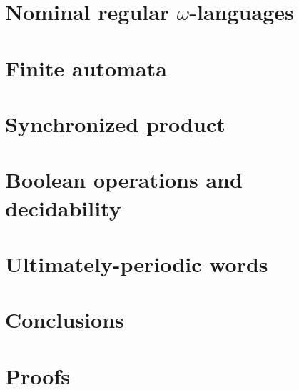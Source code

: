 \documentclass[orivec]{llncs}
\begin{document}
\section{Nominal regular \texorpdfstring{$\omega$}{omega}-languages}\label{sec:languages}


\section{Finite automata}\label{sec:hd-automata}



\section{Synchronized product}\label{sec:sync-product}


\section{Boolean operations and decidability}\label{sec:boolean-operations-decidability}

\section{Ultimately-periodic words}\label{sec:up-words}

\section{Conclusions}\label{sec:conclusions}








\appendix
\section{Proofs}

\end{document}
